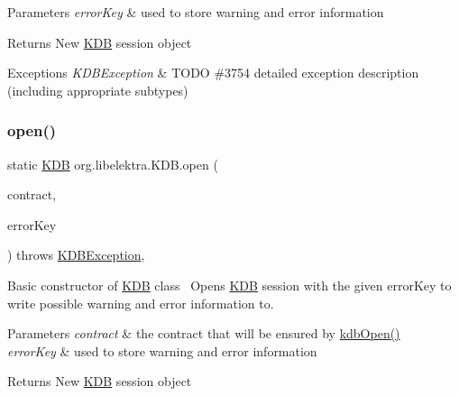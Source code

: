 \begin{DoxyParams}{Parameters}
{\em error\+Key} & used to store warning and error information \\
\hline
\end{DoxyParams}
\begin{DoxyReturn}{Returns}
New \hyperlink{classorg_1_1libelektra_1_1KDB}{K\+DB} session object 
\end{DoxyReturn}

\begin{DoxyExceptions}{Exceptions}
{\em K\+D\+B\+Exception} & T\+O\+DO \#3754 detailed exception description (including appropriate subtypes) \\
\hline
\end{DoxyExceptions}
\mbox{\label{classorg_1_1libelektra_1_1KDB_aabb6b3695bfa7d90cd8003d245425bf8}} 
\subsubsection{\texorpdfstring{open()}{open()}\hspace{0.1cm}{\footnotesize\ttfamily [2/2]}}
{\footnotesize\ttfamily static \hyperlink{classorg_1_1libelektra_1_1KDB}{K\+DB} org.\+libelektra.\+K\+D\+B.\+open (\begin{DoxyParamCaption}\item[{final \hyperlink{classorg_1_1libelektra_1_1KeySet}{Key\+Set}}]{contract,  }\item[{final \hyperlink{classorg_1_1libelektra_1_1Key}{Key}}]{error\+Key }\end{DoxyParamCaption}) throws \hyperlink{classorg_1_1libelektra_1_1exception_1_1KDBException}{K\+D\+B\+Exception}\hspace{0.3cm}{\ttfamily [inline]}, {\ttfamily [static]}}



Basic constructor of \hyperlink{classorg_1_1libelektra_1_1KDB}{K\+DB} class~\newline
 Opens \hyperlink{classorg_1_1libelektra_1_1KDB}{K\+DB} session with the given error\+Key to write possible warning and error information to. 


\begin{DoxyParams}{Parameters}
{\em contract} & the contract that will be ensured by \hyperlink{group__kdb_ga844e1299a84c3fbf1d3a905c5c893ba5}{kdb\+Open()} \\
\hline
{\em error\+Key} & used to store warning and error information \\
\hline
\end{DoxyParams}
\begin{DoxyReturn}{Returns}
New \hyperlink{classorg_1_1libelektra_1_1KDB}{K\+DB} session object 
\end{DoxyReturn}

